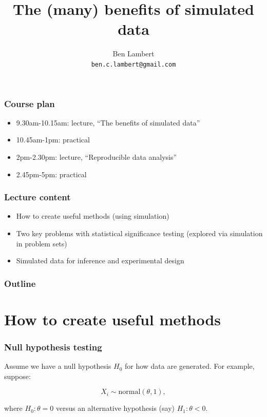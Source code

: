 \documentclass[handout]{beamer}
\title{The (many) benefits of simulated data}
\author[Ben Lambert]{Ben Lambert\inst{1}\\ \texttt{ben.c.lambert@gmail.com}}
\date{\displaydate{date}}
\institute[University of Oxford]{
\inst{1}University of Oxford}
\begin{document}
\begin{frame}
\titlepage
\end{frame}

\begin{frame}
	\frametitle{Course plan}
	\begin{itemize}
		\item 9.30am-10.15am: lecture, ``The benefits of simulated data''
		\item 10.45am-1pm: practical
		\item 2pm-2.30pm: lecture, ``Reproducible data analysis''
		\item 2.45pm-5pm: practical
	\end{itemize}
	
\end{frame}

\begin{frame}
	\frametitle{Lecture content}
	
	\begin{itemize}
		\item How to create useful methods (using simulation)
		\item Two key problems with statistical significance testing (explored via simulation in problem sets)
		\item Simulated data for inference and experimental design
	\end{itemize}
	
\end{frame}

\begin{frame}
	\frametitle{Outline}
	\tableofcontents
\end{frame}

\section{How to create useful methods}
\frame{\tableofcontents[currentsection]}

\begin{frame}
	\frametitle{Null hypothesis testing}
	
	Assume we have a null hypothesis $H_0$ for how data are generated. For example, suppose:
	
	\begin{equation}
	X_i \sim \text{normal}(\theta, 1),
	\end{equation}
	
	where $H_0: \theta=0$ versus an alternative hypothesis (say) $H_1: \theta < 0$.
	
\end{frame}
\end{document}
